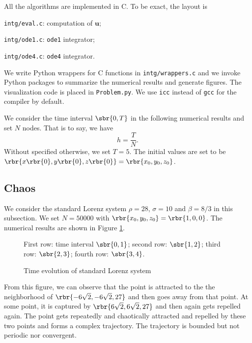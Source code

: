\documentclass[english, nochinese]{pnote}
\begin{document}
All the algorithms are implemented in C. To be exact, the layout is
\begin{partlist}
\item \verb"intg/eval.c": computation of $\mathbf{u}$;
\item \verb"intg/ode1.c": \verb"ode1" integrator;
\item \verb"intg/ode4.c": \verb"ode4" integrator.
\end{partlist}
We write Python wrappers for C functions in \verb"intg/wrappers.c" and we invoke Python packages to summarize the numerical results and generate figures. The visualization code is placed in \verb"Problem.py". We use \verb"icc" instead of \verb"gcc" for the compiler by default.

We consider the time interval $ \sbr{ 0, T } $ in the following numerical results and set $N$ nodes. That is to say, we have
\begin{equation}
h = \frac{T}{N}.
\end{equation}
Without specified otherwise, we set $ T = 5 $. The initial values are set to be $ \rbr{ x \rbr{0}, y \rbr{0}, z \rbr{0} } = \rbr{ x_0, y_0, z_0 } $.

\subsection{Chaos}

We consider the standard Lorenz system $ \rho = 28 $, $ \sigma = 10 $ and $ \beta = 8 / 3 $ in this subsection. We set $ N = 50000 $ with $ \rbr{ x_0, y_0, z_0 } = \rbr{ 1, 0, 0 } $. The numerical results are shown in Figure \ref{Fig:Chaos}.

\begin{figure}[htbp]
{
\centering
\scalebox{0.5}{}
\scalebox{0.5}{}
\scalebox{0.5}{}
\scalebox{0.5}{}
\caption{Time evolution of standard Lorenz system}
\label{Fig:Chaos}
}
{
\footnotesize First row: time interval $ \sbr{ 0, 1 } $; second row: $ \sbr{ 1, 2 } $; third row: $ \sbr{ 2, 3 } $; fourth row: $ \sbr{ 3, 4 } $.
}
\end{figure}

From this figure, we can observe that the point is attracted to the the neighborhood of $ \rbr{ -6 \sqrt{2}, -6 \sqrt{2}, 27 } $ and then goes away from that point. At some point, it is captured by $ \rbr{ 6 \sqrt{2}, 6 \sqrt{2}, 27 } $ and then again gets repelled again. The point gets repeatedly and chaotically attracted and repelled by these two points and forms a complex trajectory. The trajectory is bounded but not periodic nor convergent.
\end{document}
